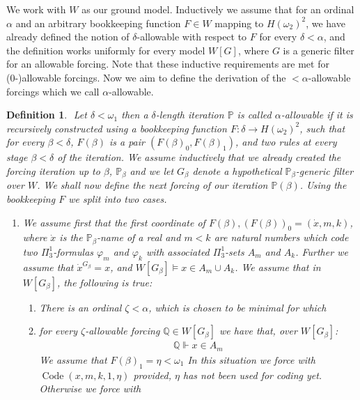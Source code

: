\documentclass[a4paper,11pt]{article}
\newtheorem{definition}[theorem]{Definition}
\newcommand{\forceP}{\mathbb{P}}
\newcommand{\forceQ}{\mathbb{Q}}
\begin{document}
 We work with $W$ as our ground model.  Inductively we assume that for an ordinal $\alpha$ and an arbitrary bookkeeping function $F \in W$ mapping to $H(\omega_2)^2$, we have already defined the notion of $\delta$-allowable with respect to $F$ for every $\delta < \alpha$, and the definition works uniformly for every model $W[G]$, where $G$ is a generic filter for an allowable forcing. Note that these inductive requirements are met for (0-)allowable forcings. Now we aim to define the derivation of the $<\alpha$-allowable forcings which we call $\alpha$-allowable.
    ﻿
    ﻿
    \begin{definition}
    ﻿
    Let  $\delta  < \omega_1$ then a $\delta$-length iteration $\forceP$ is called $\alpha$-allowable if it is recursively constructed using a bookkeeping function $F: \delta \rightarrow H(\omega_2)^2$, such that for every $\beta < \delta$, $F(\beta)$ is a pair $(F(\beta)_0, F(\beta)_1)$, and two rules at every stage $\beta < \delta$ of the iteration. We assume inductively that we already created the forcing iteration up to $\beta$, $\forceP_{\beta}$ and we let $G_{\beta}$ denote a hypothetical $\forceP_{\beta}$-generic filter over $W$. We shall now define the next forcing of our iteration $\forceP(\beta)$. Using the bookkeeping $F$ we split into two cases.
    ﻿
    \begin{enumerate}
    ﻿
    \item[(a)] We assume first that the first coordinate of $F(\beta) ,(F(\beta))_0=(\dot{x},m,k)$, where $\dot{x}$ is the $\forceP_{\beta}$-name of a real and $m<k$ are natural numbers which code two $\Pi^1_3$-formulas $\varphi_m$ and $\varphi_k$ with associated $\Pi^1_3$-sets $A_m$ and $A_k$. Further we assume that $\dot{x}^{G_{\beta}}=x$, and $W[G_{\beta}] \models x \in A_m \cup A_k$. 
    ﻿
    We assume that in $W[G_{\beta}]$, the following is true:
    ﻿
    \begin{enumerate}
    ﻿
    \item[] There is an ordinal $\zeta < \alpha$, which is chosen to be minimal for which
    ﻿
    \item[(i)] for every $\zeta$-allowable forcing $\forceQ \in W[G_{\beta}]$  we have that, over $W[G_{\beta}]$:
    ﻿
    \begin{align*}
    \forceQ \Vdash  x \in A_m
    \end{align*}
    We assume that $F(\beta)_1= \eta < \omega_1$
    In this situation we force with $\operatorname{Code} (x,m,k,1,\eta)$ provided, $\eta$ has not been used for coding yet. Otherwise we force with

\end{enumerate}
\end{enumerate}
\end{definition}
\end{document}
